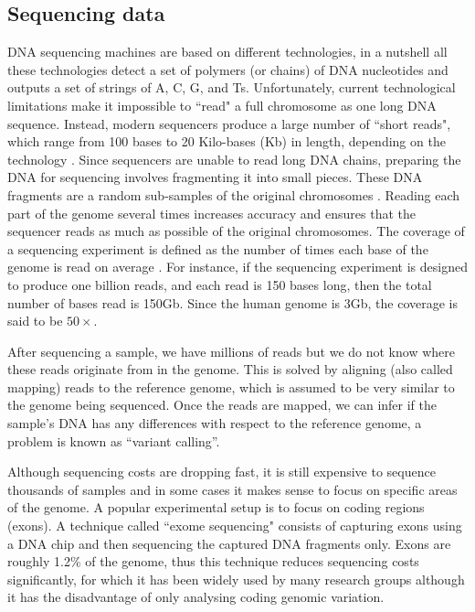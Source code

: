 \subsection{Sequencing data}

DNA sequencing machines are based on different technologies, in a nutshell all these technologies detect a set of polymers (or chains) of DNA nucleotides and outputs a set of strings of A, C, G, and Ts. 
Unfortunately, current technological limitations make it impossible to ``read" a full chromosome as one long DNA sequence. 
Instead, modern sequencers produce a large number of ``short reads", which range from 100 bases to 20 Kilo-bases (Kb) in length, depending on the technology \cite{quail2012tale}. 
Since sequencers are unable to read long DNA chains, preparing the DNA for sequencing involves fragmenting it into small pieces. 
These DNA fragments are a random sub-samples of the original chromosomes \cite{shendure2008next}. 
Reading each part of the genome several times increases accuracy and ensures that the sequencer reads as much as possible of the original chromosomes. 
The coverage of a sequencing experiment is defined as the number of times each base of the genome is read on average \cite{shendure2008next,quail2012tale}. 
For instance, if the sequencing experiment is designed to produce one billion reads, and each read is 150 bases long, then the total number of bases read is 150Gb. Since the human genome is 3Gb, the coverage is said to be $50 \times$.

After sequencing a sample, we have millions of reads but we do not know where these reads originate from in the genome. 
This is solved by aligning (also called mapping) reads to the reference genome, which is assumed to be very similar to the genome being sequenced. Once the reads are mapped, we can infer if the sample's DNA has any differences with respect to the reference genome, a problem is known as ``variant calling''. 

Although sequencing costs are dropping fast, it is still expensive to sequence thousands of samples and in some cases it makes sense to focus on specific areas of the genome. 
A popular experimental setup is to focus on coding regions (exons). 
A technique called ``exome sequencing" \cite{clark2011performance} consists of capturing exons using a DNA chip and then sequencing the captured DNA fragments only. 
Exons are roughly 1.2\% of the genome, thus this technique reduces sequencing costs significantly, for which it has been widely used by many research groups although it has the disadvantage of only analysing coding genomic variation.

